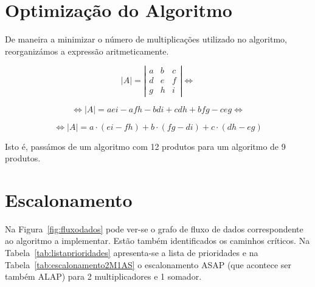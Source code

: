 \documentclass[a4paper]{article}
\begin{document}


\tableofcontents
\pagebreak

\section{Optimização do Algoritmo}
De maneira a minimizar o número de multiplicações utilizado no algoritmo, reorganizámos a expressão aritmeticamente.

\[
\left| A \right| = \left|
	\begin{matrix}
		a & b & c\\
		d & e & f\\
		g & h & i
	\end{matrix}
\right| \Leftrightarrow\]

\[
\Leftrightarrow \left| A \right| = a e i - a f h - b d i + c d h + b f g - c e g \Leftrightarrow
\]

\[
\Leftrightarrow \left| A \right| = a \cdot ( e i - f h ) + b \cdot ( f g - d i ) + c \cdot ( d h - e g )
\]

Isto é, passámos de um algoritmo com 12 produtos para um algoritmo de 9 produtos.

\section{Escalonamento}

Na Figura~\ref{fig:fluxodados} pode ver-se o grafo de fluxo de dados correspondente ao algoritmo a implementar. Estão também identificados os caminhos críticos. Na Tabela~\ref{tab:listaprioridades} apresenta-se a lista de prioridades e na Tabela~\ref{tab:escalonamento2M1AS} o escalonamento ASAP (que acontece ser também ALAP) para 2 multiplicadores e 1 somador.
\end{document}
